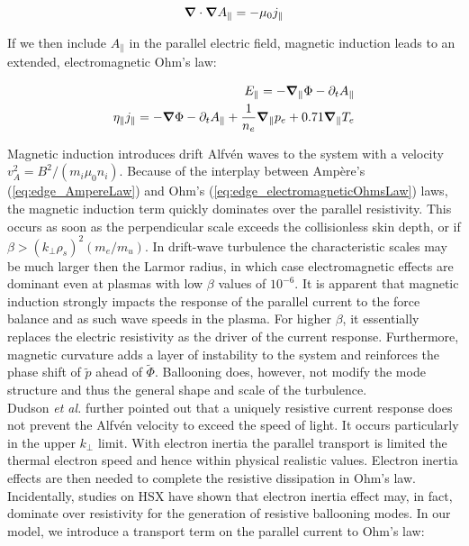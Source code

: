 \begin{equation}
	\label{eq:edge_AmpereLaw}
	\grad\cdot\grad A_\parallel = -\mu_0 j_\parallel
\end{equation}

If we then include $A_\parallel$ in the parallel electric field, magnetic induction leads to an extended, electromagnetic Ohm's law:

\begin{align}
	\label{eq:edge_EparaElectromagnetic}
	E_\parallel = -\grad_\parallel \Phi - \partial_tA_\parallel \\
	\label{eq:edge_electromagneticOhmsLaw}
	\eta_\parallel j_\parallel = -\grad\Phi -\partial_t A_\parallel + \frac{1}{n_e}\grad_\parallel p_e + 0.71\grad_\parallel T_e
\end{align}

Magnetic induction introduces drift Alfvén waves to the system with a velocity $v_A^2 = B^2/(m_i \mu_0 n_i)$. Because of the interplay between Ampère's (\ref{eq:edge_AmpereLaw}) and Ohm's (\ref{eq:edge_electromagneticOhmsLaw}) laws, the magnetic induction term quickly dominates over the parallel resistivity. This occurs as soon as the perpendicular scale exceeds the collisionless skin depth, or if $\beta > \left(k_\perp\rho_s\right)^2(m_e/m_u)$\cite{mikhailovskii1963stability}. In drift-wave turbulence the characteristic scales may be much larger then the Larmor radius, in which case electromagnetic effects are dominant even at plasmas with low $\beta$ values of $10^{-6}$\cite{scott1997}. It is apparent that magnetic induction strongly impacts the response of the parallel current to the force balance and as such wave speeds in the plasma. For higher $\beta$, it essentially replaces the electric resistivity as the driver of the current response. Furthermore, magnetic curvature adds a layer of instability to the system and reinforces the phase shift of $\tilde{p}$ ahead of $\tilde{\Phi}$. Ballooning does, however, not modify the mode structure and thus the general shape and scale of the turbulence\cite{scott1997three}. \\ 

Dudson \emph{et al.}\cite{Dudson2021} further pointed out that a uniquely resistive current response does not prevent the Alfvén velocity to exceed the speed of light. It occurs particularly in the upper $k_\perp$ limit. With electron inertia the parallel transport is limited the thermal electron speed and hence within physical realistic values. Electron inertia effects are then needed to complete the resistive dissipation in Ohm's law. Incidentally, studies on HSX have shown that electron inertia effect may, in fact, dominate over resistivity for the generation of resistive ballooning modes\cite{rafiq2009unified}. In our model, we introduce a transport term on the parallel current to Ohm's law: 

